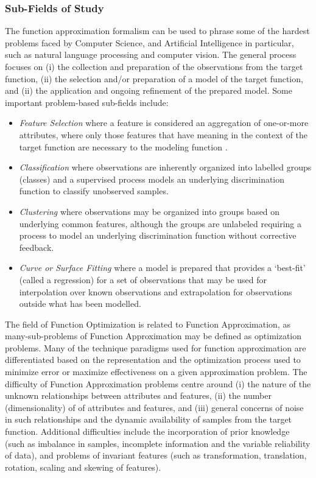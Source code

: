 \begin{bibunit}
\subsubsection{Sub-Fields of Study}
The function approximation formalism can be used to phrase some of the hardest problems faced by Computer Science, and Artificial Intelligence in particular, such as natural language processing and computer vision. 
The general process focuses on (i) the collection and preparation of the observations from the target function, (ii) the selection and/or preparation of a model of the target function, and (ii) the application and ongoing refinement of the prepared model. 
Some important problem-based sub-fields include: 
\begin{itemize}
	\item \emph{Feature Selection} where a feature is considered an aggregation of one-or-more attributes, where only those features that have meaning in the context of the target function are necessary to the modeling function \cite{Kudo2000, Guyon2003}.
	\item \emph{Classification} where observations are inherently organized into labelled groups (classes) and a supervised process models an underlying discrimination function to classify unobserved samples.
	\item \emph{Clustering} where observations may be organized into groups based on underlying common features, although the groups are unlabeled requiring a process to model an underlying discrimination function without corrective feedback.
	\item \emph{Curve or Surface Fitting} where a model is prepared that provides a `best-fit' (called a regression) for a set of observations that may be used for interpolation over known observations and extrapolation for observations outside what has been modelled.
\end{itemize}

The field of Function Optimization is related to Function Approximation, as many-sub-problems of Function Approximation may be defined as optimization problems. Many of the technique paradigms used for function approximation are differentiated based on the representation and the optimization process used to minimize error or maximize effectiveness on a given approximation problem. 
The difficulty of Function Approximation problems centre around (i) the nature of the unknown relationships between attributes and features, (ii) the number (dimensionality) of of attributes and features, and (iii) general concerns of noise in such relationships and the dynamic availability of samples from the target function.
Additional difficulties include the incorporation of prior knowledge (such as imbalance in samples, incomplete information and the variable reliability of data), and problems of invariant features (such as transformation, translation, rotation, scaling and skewing of features).



\end{bibunit}
